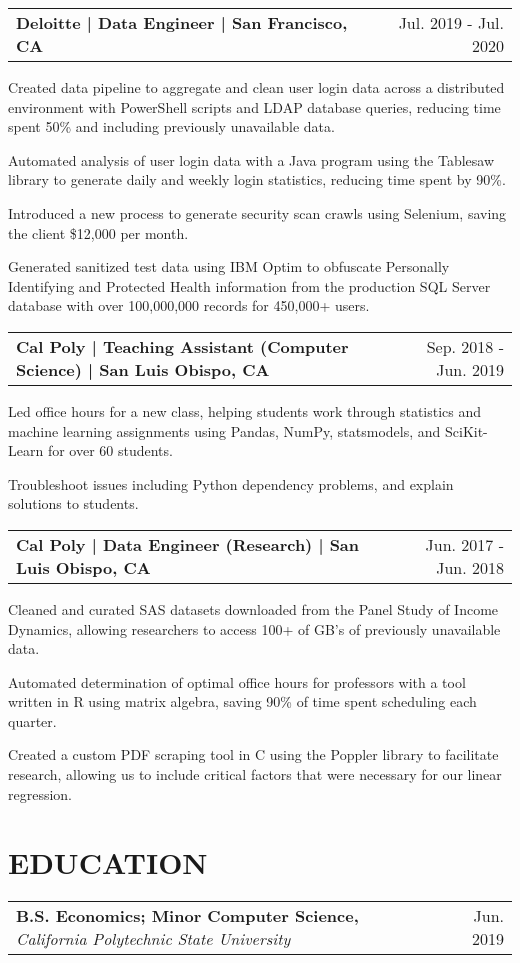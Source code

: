 \documentclass{article}
\makeatletter
\newcommand{\beginResumeList}{\begin{itemize}\setlength\itemsep{0em}\begin{minipage}{0.9\textwidth}}
\newcommand{\resumeListEnd}{\end{minipage}\end{itemize}}
\newcommand{\normalItem}[1]{\normalsize\item{#1}}
\newcommand{\experience}[2]{
  \begin{tabular*}{\textwidth}[t]{l@{\extracolsep{\fill}}r}
    \normalsize\textbf{#1} & \normalsize #2 \\
  \end{tabular*}
}
\newcommand{\education}[3]{
  \begin{tabular*}{\textwidth}[t]{l@{\extracolsep{\fill}}r}
    \normalsize\textbf{#1, }\textit{#2} & \normalsize #3 \\
  \end{tabular*}\vspace{-10pt}
}
\makeatother
\begin{document}
  \experience
    {Deloitte | Data Engineer | San Francisco, CA}
    {Jul. 2019 - Jul. 2020}
    \beginResumeList
      \normalItem{Created data pipeline to aggregate and clean user login data across a distributed environment with PowerShell scripts and LDAP database queries, reducing time spent 50\% and including previously unavailable data.}
      \normalItem{Automated analysis of user login data with a Java program using the Tablesaw library to generate daily and weekly login statistics, reducing time spent by 90\%.}
      \normalItem{Introduced a new process to generate security scan crawls using Selenium, saving the client \$12,000 per month.}
      \normalItem{Generated sanitized test data using IBM Optim to obfuscate Personally Identifying and Protected Health information from the production SQL Server database with over 100,000,000 records for 450,000+ users.}
    \resumeListEnd

  \experience
    {Cal Poly | Teaching Assistant (Computer Science) | San Luis Obispo, CA}
    {Sep. 2018 - Jun. 2019}
    \beginResumeList
      \normalItem{Led office hours for a new class, helping students work through statistics and machine learning assignments using Pandas, NumPy, statsmodels, and SciKit-Learn for over 60 students.}
      \normalItem{Troubleshoot issues including Python dependency problems, and explain solutions to students.}
    \resumeListEnd

  \experience
    {Cal Poly | Data Engineer (Research) | San Luis Obispo, CA}
    {Jun. 2017 - Jun. 2018}
    \beginResumeList
      \normalItem{Cleaned and curated SAS datasets downloaded from the Panel Study of Income Dynamics, allowing researchers to access 100+ of GB's of previously unavailable data.}
      \normalItem{Automated determination of optimal office hours for professors with a tool written in R using matrix algebra, saving 90\% of time spent scheduling each quarter.}
      \normalItem{Created a custom PDF scraping tool in C using the Poppler library to facilitate research, allowing us to include critical factors that were necessary for our linear regression.}
    \resumeListEnd

\section{EDUCATION}
  \education
    {B.S. Economics; Minor Computer Science}
    {California Polytechnic State University}
    {Jun. 2019}
\end{document}
